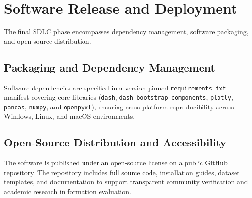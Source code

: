 \section{Software Release and Deployment}

The final SDLC phase encompasses dependency management, software packaging, and open-source distribution.

\subsection{Packaging and Dependency Management}
Software dependencies are specified in a version-pinned \texttt{requirements.txt} manifest covering core libraries (\texttt{dash}, \texttt{dash-bootstrap-components}, \texttt{plotly}, \texttt{pandas}, \texttt{numpy}, and \texttt{openpyxl}), ensuring cross-platform reproducibility across Windows, Linux, and macOS environments.

\subsection{Open-Source Distribution and Accessibility}
The software is published under an open-source license on a public GitHub repository. The repository includes full source code, installation guides, dataset templates, and documentation to support transparent community verification and academic research in formation evaluation.